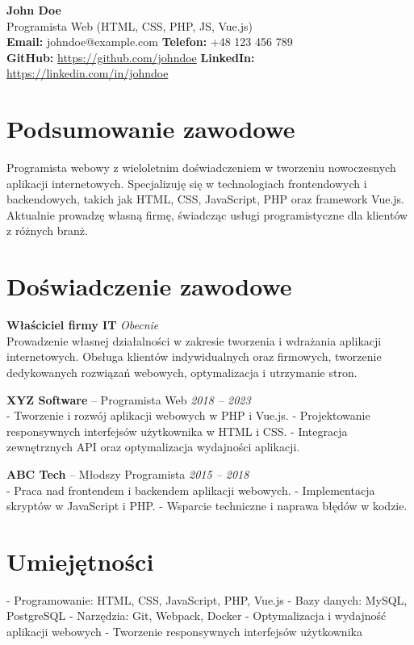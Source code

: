 \documentclass[a4paper,10pt]{article}
\begin{document}
\begin{center}
    {\LARGE \textbf{John Doe}}\\
    {\large Programista Web (HTML, CSS, PHP, JS, Vue.js)}\\
    \vspace{0.5cm}
    \textbf{Email:} johndoe@example.com \hspace{1cm} \textbf{Telefon:} +48 123 456 789 \\
    \textbf{GitHub:} \url{https://github.com/johndoe} \hspace{1cm} \textbf{LinkedIn:} \url{https://linkedin.com/in/johndoe} 
\end{center}

\section{Podsumowanie zawodowe}
Programista webowy z wieloletnim doświadczeniem w tworzeniu nowoczesnych aplikacji internetowych. Specjalizuję się w technologiach frontendowych i backendowych, takich jak HTML, CSS, JavaScript, PHP oraz framework Vue.js. Aktualnie prowadzę własną firmę, świadcząc usługi programistyczne dla klientów z różnych branż.

\section{Doświadczenie zawodowe}
\textbf{Właściciel firmy IT} 
\hfill \textit{Obecnie}\\
Prowadzenie własnej działalności w zakresie tworzenia i wdrażania aplikacji internetowych. Obsługa klientów indywidualnych oraz firmowych, tworzenie dedykowanych rozwiązań webowych, optymalizacja i utrzymanie stron.

\textbf{XYZ Software} – Programista Web 
\hfill \textit{2018 – 2023}\\
- Tworzenie i rozwój aplikacji webowych w PHP i Vue.js. 
- Projektowanie responsywnych interfejsów użytkownika w HTML i CSS. 
- Integracja zewnętrznych API oraz optymalizacja wydajności aplikacji.

\textbf{ABC Tech} – Młodszy Programista 
\hfill \textit{2015 – 2018}\\
- Praca nad frontendem i backendem aplikacji webowych.
- Implementacja skryptów w JavaScript i PHP.
- Wsparcie techniczne i naprawa błędów w kodzie.

\section{Umiejętności}
- Programowanie: HTML, CSS, JavaScript, PHP, Vue.js
- Bazy danych: MySQL, PostgreSQL
- Narzędzia: Git, Webpack, Docker
- Optymalizacja i wydajność aplikacji webowych
- Tworzenie responsywnych interfejsów użytkownika
\end{document}
